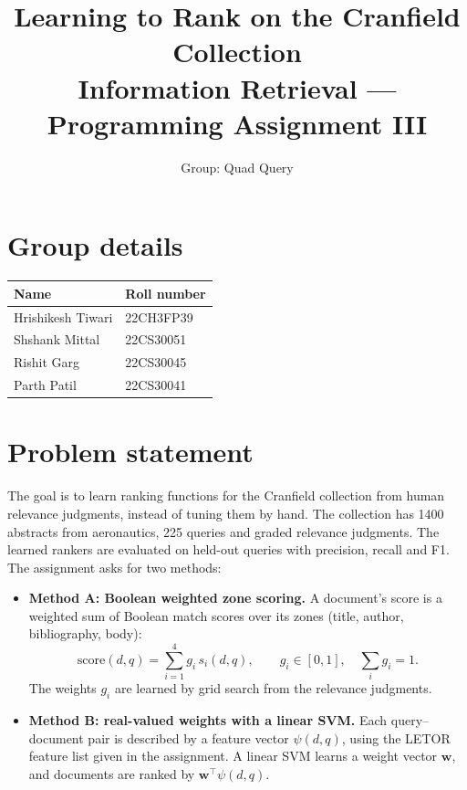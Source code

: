 \documentclass[11pt,a4paper]{article}
\title{\textbf{Learning to Rank on the Cranfield Collection}\\[4pt]
\large Information Retrieval --- Programming Assignment III}
\author{Group: Quad Query}
\date{}
\begin{document}
\maketitle

\section{Group details}

\begin{table}[H]
\centering
\begin{tabular}{ll}
\toprule
\textbf{Name} & \textbf{Roll number} \\
\midrule
Hrishikesh Tiwari & 22CH3FP39 \\
Shshank Mittal    & 22CS30051 \\
Rishit Garg       & 22CS30045 \\
Parth Patil       & 22CS30041 \\
\bottomrule
\end{tabular}
\end{table}

\section{Problem statement}

The goal is to learn ranking functions for the Cranfield collection from human relevance
judgments, instead of tuning them by hand. The collection has 1400 abstracts from
aeronautics, 225 queries and graded relevance judgments. The learned rankers are evaluated
on held-out queries with precision, recall and F1. The assignment asks for two methods:

\begin{itemize}
  \item \textbf{Method A: Boolean weighted zone scoring.} A document's score is a weighted
  sum of Boolean match scores over its zones (title, author, bibliography, body):
  \begin{equation}
    \text{score}(d,q) = \sum_{i=1}^{4} g_i\, s_i(d,q), \qquad g_i \in [0,1],\quad \sum_i g_i = 1 .
  \end{equation}
  The weights $g_i$ are learned by grid search from the relevance judgments.

  \item \textbf{Method B: real-valued weights with a linear SVM.} Each query--document pair
  is described by a feature vector $\psi(d,q)$, using the LETOR feature list given in the
  assignment. A linear SVM learns a weight vector $\mathbf{w}$, and documents are ranked by
  $\mathbf{w}^\top\psi(d,q)$.
\end{itemize}
\end{document}
